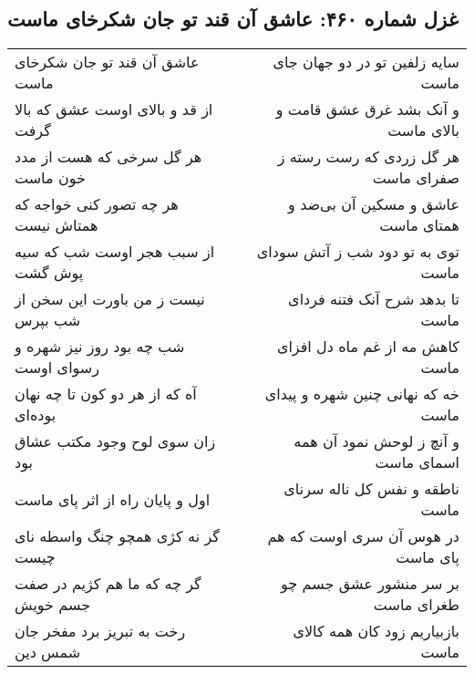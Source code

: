 \begin{center}
\section*{غزل شماره ۴۶۰: عاشق آن قند تو جان شکرخای ماست}
\label{sec:0460}
\begin{longtable}{l p{0.5cm} r}
عاشق آن قند تو جان شکرخای ماست
&&
سایه زلفین تو در دو جهان جای ماست
\\
از قد و بالای اوست عشق که بالا گرفت
&&
و آنک بشد غرق عشق قامت و بالای ماست
\\
هر گل سرخی که هست از مدد خون ماست
&&
هر گل زردی که رست رسته ز صفرای ماست
\\
هر چه تصور کنی خواجه که همتاش نیست
&&
عاشق و مسکین آن بی‌ضد و همتای ماست
\\
از سبب هجر اوست شب که سیه پوش گشت
&&
توی به تو دود شب ز آتش سودای ماست
\\
نیست ز من باورت این سخن از شب بپرس
&&
تا بدهد شرح آنک فتنه فردای ماست
\\
شب چه بود روز نیز شهره و رسوای اوست
&&
کاهش مه از غم ماه دل افزای ماست
\\
آه که از هر دو کون تا چه نهان بوده‌ای
&&
خه که نهانی چنین شهره و پیدای ماست
\\
زان سوی لوح وجود مکتب عشاق بود
&&
و آنچ ز لوحش نمود آن همه اسمای ماست
\\
اول و پایان راه از اثر پای ماست
&&
ناطقه و نفس کل ناله سرنای ماست
\\
گر نه کژی همچو چنگ واسطه نای چیست
&&
در هوس آن سری اوست که هم پای ماست
\\
گر چه که ما هم کژیم در صفت جسم خویش
&&
بر سر منشور عشق جسم چو طغرای ماست
\\
رخت به تبریز برد مفخر جان شمس دین
&&
بازبیاریم زود کان همه کالای ماست
\\
\end{longtable}
\end{center}
